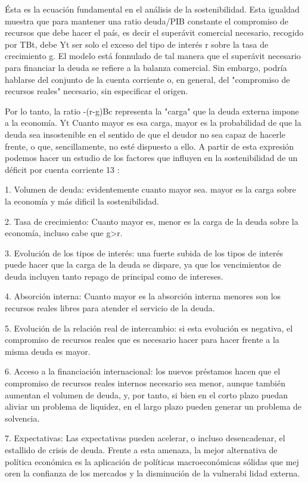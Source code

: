 \documentclass[10pt,a4paper]{article}
\begin{document}
Ésta es la ecuación fundamental en el análisis de la sostenibilidad. Esta igualdad muestra que para mantener una ratio deuda/PIB constante el compromiso de recursos que debe hacer el país, es decir el superávit comercial necesario, recogido por TBt, debe Yt ser solo el exceso del tipo de interés r sobre la tasa de crecimiento g. El modelo está fonnulado de tal manera que el superávit necesario para financiar la deuda se refiere a la balanza comercial. Sin embargo, podría hablarse del conjunto de la cuenta corriente o, en general, del "compromiso de recursos reales" necesario, sin especificar el origen. 

Por lo tanto, la ratio -(r-g)Bc representa la "carga" que la deuda externa impone a la economía. Yt Cuanto mayor es esa carga, mayor es la probabilidad de que la deuda sea insostenible en el sentido de que el deudor no sea capaz de hacerle frente, o que, sencillamente, no esté dispuesto a ello. A partir de esta expresión podemos hacer un estudio de los factores que influyen en la sostenibilidad de un déficit por cuenta corriente 13 : 

1. Volumen de deuda: evidentemente cuanto mayor sea. mayor es la carga sobre la economía y más dificil la sostenibilidad. 

2. Tasa de crecimiento: Cuanto mayor es, menor es la carga de la deuda sobre la economía, incluso cabe que g>r.

3. Evolución de los tipos de interés: una fuerte subida de los tipos de interés puede hacer que la carga de la deuda se dispare, ya que los vencimientos de deuda incluyen tanto repago de principal como de intereses. 

4. Absorción interna: Cuanto mayor es la absorción interna menores son los recursos reales libres para atender el servicio de la deuda. 

5. Evolución de la relación real de intercambio: si esta evolución es negativa, el compromiso de recursos reales que es necesario hacer para hacer frente a la misma deuda es mayor.

6. Acceso a la financiación internacional: los nuevos préstamos hacen que el compromiso de recursos reales internos necesario sea menor, aunque también aumentan el volumen de deuda, y, por tanto, si bien en el corto plazo puedan aliviar un problema de liquidez, en el largo plazo pueden generar un problema de solvencia.

7. Expectativas: Las expectativas pueden acelerar, o incluso desencadenar, el estallido de crisis de deuda. Frente a esta amenaza, la mejor alternativa de política económica es la aplicación de políticas macroeconómicas sólidas que mej oren la confianza de los mercados y la disminución de la vulnerabi lidad externa.
\end{document}
